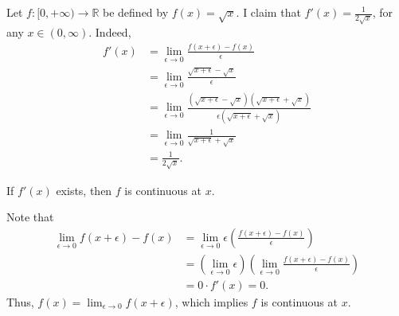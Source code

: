 \begin{exmp}{}{}
	Let \(f\colon [0, +\infty) \to \mathbb{R}\) be defined by \(f(x) = \sqrt{x}\). I claim that \(f'(x) = \frac{1}{2\sqrt{x}}\), for any \(x \in (0, \infty)\). Indeed,
	\begin{align*}
		f'(x) &= \lim_{\epsilon \to 0} \frac{f(x+\epsilon) - f(x)}{\epsilon} \\
			  &= \lim_{\epsilon \to 0} \frac{\sqrt{x+\epsilon} - \sqrt{x}}{\epsilon} \\
			  &= \lim_{\epsilon \to 0} \frac{(\sqrt{x+\epsilon} - \sqrt{x})(\sqrt{x+\epsilon} + \sqrt{x})}{\epsilon(\sqrt{x+\epsilon} + \sqrt{x})} \\
			  &= \lim_{\epsilon \to 0} \frac{1}{\sqrt{x+\epsilon} + \sqrt{x}} \\
			  &= \frac{1}{2\sqrt{x}}.
	\end{align*}
\end{exmp}

\begin{thm}{}{}
	If \(f'(x)\) exists, then \(f\) is continuous at \(x\).
\end{thm}

\begin{dem}{}{}
	Note that
	\begin{align*}
		\lim_{\epsilon \to 0} f(x + \epsilon) - f(x) &= \lim_{\epsilon \to 0} \epsilon\left(\frac{f(x + \epsilon) - f(x)}{\epsilon}\right) \\
		&= \left(\lim_{\epsilon \to 0} \epsilon\right) \left(\lim_{\epsilon \to 0} \frac{f(x + \epsilon) - f(x)}{\epsilon}\right) \\
		&= 0 \cdot f'(x) = 0.
	\end{align*}
	Thus, \(f(x) = \lim_{\epsilon \to 0} f(x + \epsilon)\), which implies \(f\) is continuous at \(x\).
\end{dem}
